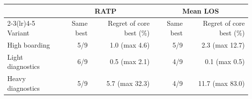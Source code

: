 \begin{tabular}{lrrrr}
\toprule
 & \multicolumn{2}{c}{RATP} & \multicolumn{2}{c}{Mean LOS} \\
\cmidrule(lr){2-3}\cmidrule(lr){4-5}
Variant & Same best & Regret of core best (\%) & Same best & Regret of core best (\%) \\
\midrule
High boarding & 5/9 & 1.0 (max 4.6) & 5/9 & 2.3 (max 12.7) \\
Light diagnostics & 6/9 & 0.5 (max 2.1) & 4/9 & 0.1 (max 0.5) \\
Heavy diagnostics & 5/9 & 5.7 (max 32.3) & 4/9 & 11.7 (max 83.0) \\
\bottomrule
\end{tabular}